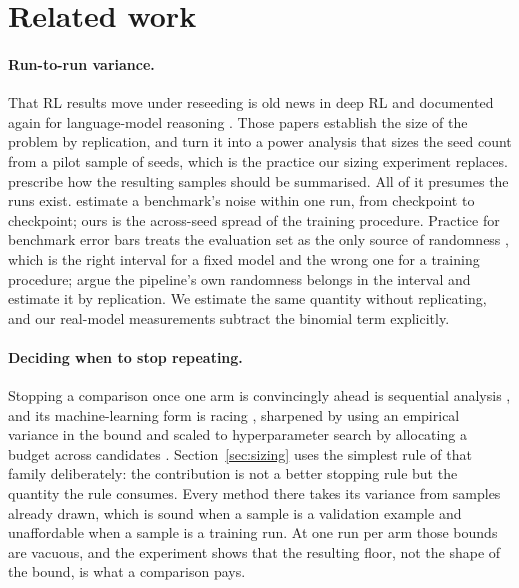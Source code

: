 \section{Related work}
\label{sec:related}

\paragraph{Run-to-run variance.} That RL results move under reseeding is old news in deep RL
\citep{henderson2018matters} and documented again for language-model reasoning
\citep{hochlehnert2025sober}. Those papers establish the size of the problem by replication, and
\citet{colas2018seeds} turn it into a power analysis that sizes the seed count from a pilot
sample of seeds, which is the practice our sizing experiment replaces.
\citet{agarwal2021precipice} prescribe how the resulting samples should be summarised. All of it
presumes the runs exist. \citet{heineman2025signal} estimate a benchmark's noise within one run,
from checkpoint to checkpoint; ours is the across-seed spread of the training procedure. Practice for benchmark error bars treats the evaluation set as the only
source of randomness \citep{miller2024adding}, which is the right interval for a fixed model and
the wrong one for a training procedure; \citet{bouthillier2021accounting} argue the pipeline's own
randomness belongs in the interval and estimate it by replication. We estimate the same quantity
without replicating, and our real-model measurements subtract the binomial term explicitly.

\paragraph{Deciding when to stop repeating.} Stopping a comparison once one arm is convincingly
ahead is sequential analysis \citep{wald1945sequential}, and its machine-learning form is racing
\citep{maron1993hoeffding, evendar2006action}, sharpened by using an empirical variance in the
bound \citep{audibert2009exploration} and scaled to hyperparameter search by allocating a budget
across candidates \citep{li2017hyperband}. Section~\ref{sec:sizing} uses the simplest rule of that
family deliberately: the contribution is not a better stopping rule but the quantity the rule
consumes. Every method there takes its variance from samples already drawn, which is sound when a
sample is a validation example and unaffordable when a sample is a training run. At one run per arm
those bounds are vacuous, and the experiment shows that the resulting floor, not the shape of the
bound, is what a comparison pays.


